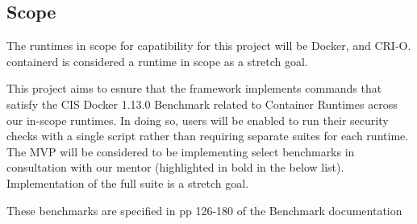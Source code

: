 \subsection*{Scope}
The runtimes in scope for capatibility for this project will be Docker, and CRI-O. containerd is considered a runtime in scope as a stretch goal.

This project aims to esnure that the framework implements commands that satisfy the CIS Docker 1.13.0 Benchmark related to Container Runtimes across our in-scope runtimes. In doing so, users will be enabled to run their security checks with a single script rather than requiring separate suites for each runtime. The MVP will be considered to be implementing select benchmarks in consultation with our mentor (highlighted in bold in the below list). Implementation of the full suite is a stretch goal.

These benchmarks are specified in pp 126-180 of the Benchmark documentation